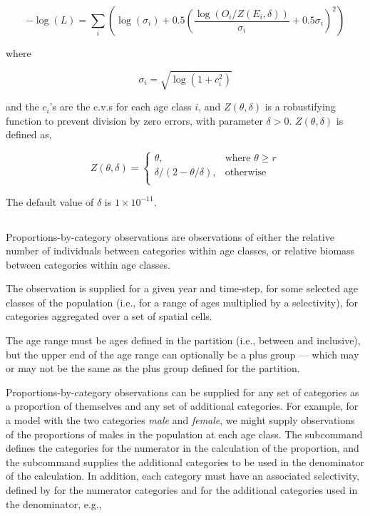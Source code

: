 {{{{{{\begin{equation}
 - \log \left(L \right) = \sum\limits_i \left( \log \left( \sigma _i \right) + 0.5\left( \frac{\log \left(O_i / Z \left(E_i,\delta \right) \right)}{\sigma_i} + 0.5 \sigma_i \right)^2 \right)
\end{equation}

where 

\begin{equation}
  \sigma_i  = \sqrt{\log \left(1+c_i^2 \right)}
\end{equation}

and the $c_i$'s are the c.v.s for each age class $i$, and $Z \left(\theta,\delta \right)$ is a robustifying function to prevent division by zero errors, with parameter $\delta>0$. $Z \left(\theta,\delta \right)$ is defined as,

\begin{equation}
   Z \left(\theta,\delta \right) = \begin{cases}
	  \theta, & \text{where $\theta \ge r$} \\
	  \delta/\left( 2-\theta/\delta \right), & \text{otherwise} \\  
  \end{cases}
\end{equation}

The default value of $\delta$ is $1 \times 10^{-11}$.

\subsection{\label{sec:proportions-by-category}}
Proportions-by-category observations are observations of either the relative number of individuals between categories within age classes, or relative biomass between categories within age classes. 

The observation is supplied for a given year and time-step, for some selected age classes of the population (i.e., for a range of ages multiplied by a selectivity), for categories aggregated over a set of spatial cells. 

The age range must be ages defined in the partition (i.e., between  and  inclusive), but the upper end of the age range can optionally be a plus group --- which may or may not be the same as the plus group defined for the partition. 

Proportions-by-category observations can be supplied for any set of categories as a proportion of themselves and any set of additional categories. For example, for a model with the two categories \emph{male} and \emph{female}, we might supply observations of the proportions of males in the population at each age class. The subcommand  defines the categories for the numerator in the calculation of the proportion, and the subcommand  supplies the additional categories to be used in the denominator of the calculation. In addition, each category must have an associated selectivity, defined by  for the numerator categories and  for the additional categories used in the denominator, e.g., 

}}}}}}
